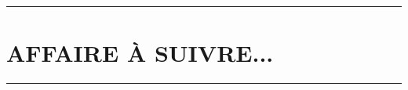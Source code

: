 \documentclass[12pt]{amsart}
\begin{document}
\bigskip

\hrule

\section{AFFAIRE À SUIVRE...}

\bigskip

\hrule



%	
%	
\end{document}

